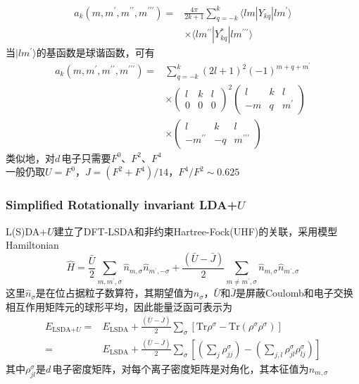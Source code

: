 \frame
{
	\begin{displaymath}
		\begin{aligned}
			a_k(m,m^{\prime},m^{\prime\prime},m^{\prime\prime\prime})=&\frac{4\pi}{2k+1}\sum_{q=-k}^k\langle lm|Y_{kq}|lm^{\prime}\rangle\\
			&\times\langle lm^{\prime\prime}|Y_{kq}^{\ast}|lm^{\prime\prime\prime}\rangle
		\end{aligned}
	\end{displaymath}
	当$|lm^{\prime}\rangle$的基函数是球谐函数，可有
	\begin{displaymath}
		\begin{aligned}
			a_k(m,m^{\prime},m^{\prime\prime},m^{\prime\prime\prime})=&\sum_{q=-k}^k(2l+1)^2(-1)^{m+q+m^{\prime}}\\
			&\times\left(
			\begin{matrix}
				l &k &l\\
				0 &0 &0
			\end{matrix}
			\right)^2\left(
			\begin{matrix}
				l &k &l\\
				-m &q &m^{\prime}
			\end{matrix}\right)\\
			&\times\left(
			\begin{matrix}
				l &k &l\\
				-m^{\prime\prime} &-q &m^{\prime\prime\prime}
			\end{matrix}\right)
		\end{aligned}
	\end{displaymath}
类似地，对$d$\,电子只需要$F^0$、$F^2$、$F^4$\\一般仍取$U=F^0$，$J=(F^2+F^4)/14$，$F^4/F^2\sim 0.625$
}

\frame
{
	\frametitle{\textrm{Simplified Rotationally invariant LDA+}$U$}
	\textrm{L(S)DA}+$U$建立了\textrm{DFT-LSDA}和非约束\textrm{Hartree-Fock(UHF)}的关联，采用模型\textrm{Hamiltonian}
\begin{displaymath}
	\hat H=\frac{\bar U}2\sum_{m,m^{\prime},\sigma}\hat n_{m,\sigma}\hat n_{m^{\prime},-\sigma}+\frac{(\bar U-\bar J)}2\sum_{m\neq m^{\prime},\sigma}\hat n_{m,\sigma}\hat n_{m^{\prime},\sigma}
\end{displaymath}
这里$\hat n_{\sigma}$是在位占据粒子数算符，其期望值为$n_{\sigma}$，$\bar U$和$\bar J$是屏蔽\textrm{Coulomb}和电子交换相互作用矩阵元的球形平均，因此能量泛函可表示为
	\begin{displaymath}
		\begin{aligned}
			E_{\textrm{LSDA+}U}=&E_{\textrm{LSDA}}+\frac{(\bar U-\bar J)}2\sum_{\sigma}\left[\mathrm{Tr}\rho^{\sigma}-\mathrm{Tr}(\rho^{\sigma}\rho^{\sigma})\right]\\
			=&E_{\textrm{LSDA}}+\frac{(\bar U-\bar J)}2\sum_{\sigma}\left[\left(\sum_j\rho_{jj}^{\sigma}\right)-\left(\sum_{j,l}\rho_{jl}^{\sigma}\rho_{lj}^{\sigma}\right)\right]
		\end{aligned}
	\end{displaymath}
	其中$\rho_{jl}^{\sigma}$是$d$\,电子密度矩阵，对每个离子密度矩阵是对角化，其本征值为$n_{m,\sigma}$
}

